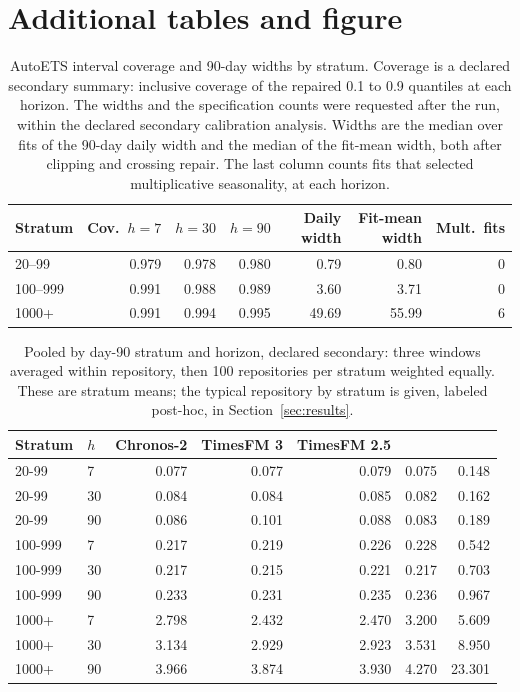 \section{Additional tables and figure}
\label{app:tables}

\begin{table}[h]
\centering\small
\caption{AutoETS interval coverage and 90-day widths by stratum. Coverage is a declared secondary summary:
inclusive coverage of the repaired 0.1 to 0.9 quantiles at each horizon. The widths and the specification
counts were requested after the run, within the declared secondary calibration analysis. Widths are the
median over fits of the 90-day daily width and the median of the fit-mean width, both after clipping and
crossing repair. The last column counts fits that selected multiplicative seasonality, at each horizon.}
\label{tab:autoets}
\begin{tabular}{lrrrrrr}
\toprule
Stratum & Cov.\ $h=7$ & $h=30$ & $h=90$ & Daily width & Fit-mean width & Mult.\ fits \\
\midrule
20--99 & 0.979 & 0.978 & 0.980 & 0.79 & 0.80 & 0 \\
100--999 & 0.991 & 0.988 & 0.989 & 3.60 & 3.71 & 0 \\
1000+ & 0.991 & 0.994 & 0.995 & 49.69 & 55.99 & 6 \\
\bottomrule
\end{tabular}
\end{table}

\begin{table}[h]
\centering\small
\caption{Pooled \qs{} by day-90 stratum and horizon, declared secondary: three windows averaged within
repository, then 100 repositories per stratum weighted equally. These are stratum means; the typical
repository by stratum is given, labeled post-hoc, in Section~\ref{sec:results}.}
\label{tab:stratum}
\begin{tabular}{llrrrrr}
\toprule
Stratum & $h$ & Chronos-2 & TimesFM 3 & TimesFM 2.5 & \lm{} & \aets{} \\
\midrule
20-99 & 7 & 0.077 & 0.077 & 0.079 & 0.075 & 0.148 \\
20-99 & 30 & 0.084 & 0.084 & 0.085 & 0.082 & 0.162 \\
20-99 & 90 & 0.086 & 0.101 & 0.088 & 0.083 & 0.189 \\
100-999 & 7 & 0.217 & 0.219 & 0.226 & 0.228 & 0.542 \\
100-999 & 30 & 0.217 & 0.215 & 0.221 & 0.217 & 0.703 \\
100-999 & 90 & 0.233 & 0.231 & 0.235 & 0.236 & 0.967 \\
1000+ & 7 & 2.798 & 2.432 & 2.470 & 3.200 & 5.609 \\
1000+ & 30 & 3.134 & 2.929 & 2.923 & 3.531 & 8.950 \\
1000+ & 90 & 3.966 & 3.874 & 3.930 & 4.270 & 23.301 \\
\bottomrule
\end{tabular}
\end{table}

